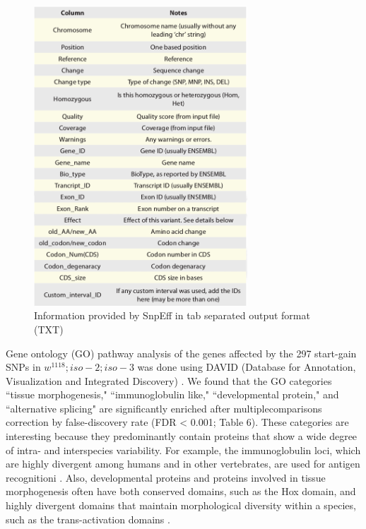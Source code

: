 \begin{figure}
    \centering
    \includegraphics[width=8cm]{snpeff_table3.png}
    \caption{Information provided by SnpEff in tab separated output format
(TXT)}
    \label{fig:snpeffTab3}
\end{figure}


Gene ontology (GO) pathway analysis of the genes affected by the 297 start-gain SNPs in $w^{1118} ; iso-2; iso-3$ was done using DAVID (Database for Annotation, Visualization and Integrated Discovery) \cite{dennis2003david,hosack2003identifying}. We found that the GO categories ``tissue morphogenesis," ``immunoglobulin like," ``developmental protein," and ``alternative splicing" are significantly enriched after multiplecomparisons correction by false-discovery rate (FDR < 0.001; Table 6). These categories are interesting because they predominantly contain proteins that show a wide degree of intra- and interspecies variability. For example, the immunoglobulin loci, which are highly divergent among humans and in other vertebrates, are used for antigen recognitioni \cite{lazure1981sequence}. Also, developmental proteins and proteins involved in tissue morphogenesis often have both conserved domains, such as the Hox domain, and highly divergent domains that maintain morphological diversity within a species, such as the trans-activation domains \cite{ruden2008edge,guarente1991generating}.

